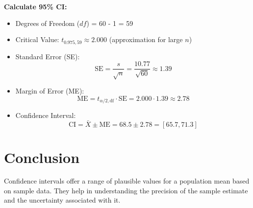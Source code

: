 \documentclass{article}
\begin{document}
\textbf{Calculate 95\% CI:}
\begin{itemize}
    \item Degrees of Freedom (\(df\)) = 60 - 1 = 59
    \item Critical Value: \(t_{0.975, 59} \approx 2.000\) (approximation for large \(n\))
    \item Standard Error (SE):
    \[
    \text{SE} = \frac{s}{\sqrt{n}} = \frac{10.77}{\sqrt{60}} \approx 1.39
    \]
    \item Margin of Error (ME):
    \[
    \text{ME} = t_{\alpha/2, \text{df}} \cdot \text{SE} = 2.000 \cdot 1.39 \approx 2.78
    \]
    \item Confidence Interval:
    \[
    \text{CI} = \bar{X} \pm \text{ME} = 68.5 \pm 2.78 = [65.7, 71.3]
    \]
\end{itemize}

\section{Conclusion}
Confidence intervals offer a range of plausible values for a population mean based on sample data. They help in understanding the precision of the sample estimate and the uncertainty associated with it.
\end{document}
